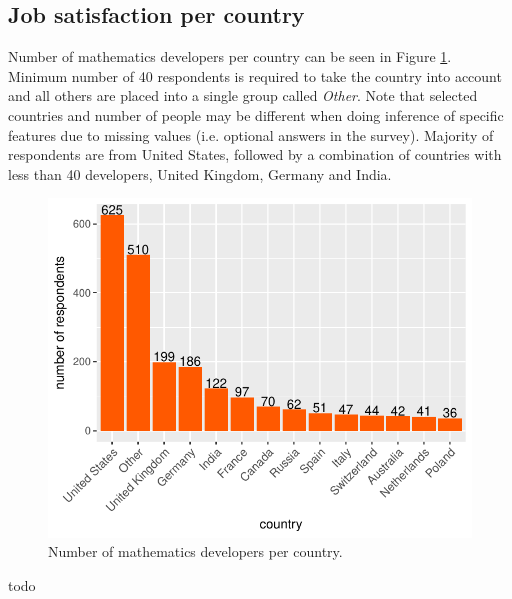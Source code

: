 \documentclass{article}
\begin{document}
\subsection{Job satisfaction per country}
Number of mathematics developers per country can be seen in Figure \ref{fig_0}. Minimum number of 40 respondents is required to take the country into account and all others are placed into a single group called \textit{Other}. Note that selected countries and number of people may be different when doing inference of specific features due to missing values (i.e. optional answers in the survey). Majority of respondents are from United States, followed by a combination of countries with less than 40 developers, United Kingdom, Germany and India.


\begin{figure}[H]
\centering
\includegraphics{report-005}
\caption{Number of mathematics developers per country.}\label{fig_0}
\end{figure}

todo
\end{document}
